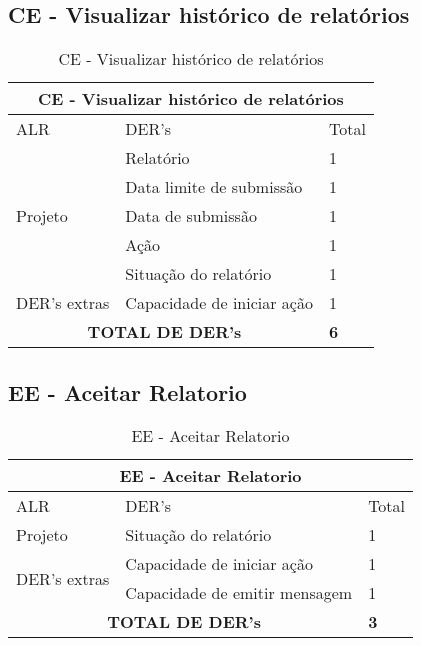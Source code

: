   \subsection{CE - Visualizar histórico de relatórios}
\begin{table}[!h]
\centering
\caption{CE - Visualizar histórico de relatórios}
\label{ce_visualizar_historico}
\begin{tabular}{|l|l|l|}
\multicolumn{3}{c}{CE - Visualizar histórico de relatórios}          \\ \hline
ALR                      & DER's                      & Total         \\ \hline
\multirow{5}{*}{Projeto} & Relatório                  & 1             \\\cline{2-3}
                         & Data limite de submissão   & 1             \\\cline{2-3}
                         & Data de submissão          & 1             \\\cline{2-3}
                         & Ação                       & 1             \\\cline{2-3}
                         & Situação do relatório      & 1             \\\hline
DER's extras             & Capacidade de iniciar ação & 1             \\\hline
\multicolumn{2}{|c|}{\textbf{TOTAL DE DER's}}                     & \textbf{6} \\ \hline
\end{tabular}
\end{table}

  \subsection{EE - Aceitar Relatorio}
  \begin{table}[!h]
\centering
\caption{EE - Aceitar Relatorio}
\label{ee_aceitar_relatorio_parcial}
\begin{tabular}{|l|l|l|}
\multicolumn{3}{c}{EE - Aceitar Relatorio}           \\\hline
ALR                      & DER's                      & Total         \\ \hline
Projeto                  & Situação do relatório      & 1             \\\hline
  \multirow{2}{*}{DER's extras} & Capacidade de iniciar ação             & 1 \\ \cline{2-3}
                 & Capacidade de emitir mensagem& 1 \\ \hline
\multicolumn{2}{|c|}{\textbf{TOTAL DE DER's}}                    & \textbf{3} \\ \hline
\end{tabular}
\end{table}

